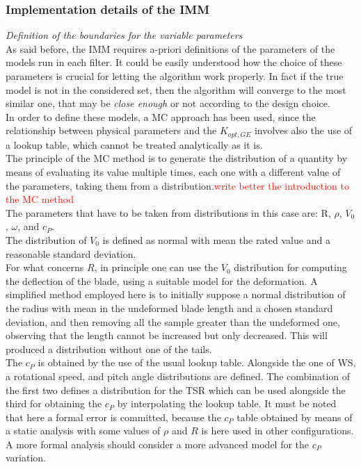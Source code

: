 \subsubsection{Implementation details of the IMM}
\textit{Definition of the boundaries for the variable parameters}\\
As said before, the IMM requires a-priori definitions of the parameters of the models run in each filter. It could be easily understood how the choice of these parameters is crucial for letting the algorithm work properly. In fact if the true model is not in the considered set, then the algorithm will converge to the most similar one, that may be \textit{close enough} or not according to the design choice.\\ 
In order to define these models, a \acrfull{MC} approach has been used, since the relationship between physical parameters and the $K_{opt,GE}$ involves also the use of a lookup table, which cannot be treated analytically as it is.\\
The principle of the \acrshort{MC} method is to generate the distribution of a quantity by means of evaluating its value multiple times, each one with a different value of the parameters, taking them from a distribution.\textcolor{red}{write better the introduction to the \acrshort{MC} method}\\
The parameters that have to be taken from distributions in this case are: R, $\rho$, $V_0$, $\omega$, and $c_P$.\\
The distribution of $V_0$ is defined as normal with mean the rated value and a reasonable standard deviation. \\
For what concerns $R$, in principle one can use the $V_0$ distribution for computing the deflection of the blade, using a suitable model for the deformation. A simplified method employed here is to initially suppose a normal distribution of the radius with mean in the undeformed blade length and a chosen standard deviation, and then removing all the sample greater than the undeformed one, observing that the length cannot be increased but only decreased. This will produced a distribution without one of the tails. \\
The $c_P$ is obtained by the use of the usual lookup table. Alongside the one of WS, a rotational speed, and pitch angle distributions are defined. The combination of the first two defines a distribution for the TSR which can be used alongside the third for obtaining the $c_P$ by interpolating the lookup table. It must be noted that here a formal error is committed, because the $c_P$ table obtained by means of a static analysis with some values of $\rho$ and $R$ is here used in other configurations. A more formal analysis should consider a more advanced model for the $c_P$ variation. 

